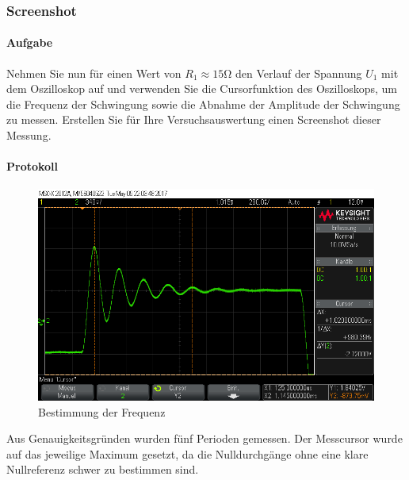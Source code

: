 \documentclass[10pt]{scrreprt}
\begin{document}
        \subsubsection{Screenshot}
        \paragraph{Aufgabe}
        Nehmen Sie nun für einen Wert von $R_1 \approx 15\si{\ohm}$ den Verlauf der Spannung $U_1$
        mit dem Oszilloskop auf und verwenden Sie die Cursorfunktion des Oszilloskops,
        um die Frequenz der Schwingung sowie die Abnahme der Amplitude
        der Schwingung zu messen. Erstellen Sie für Ihre Versuchsauswertung einen
        Screenshot dieser Messung.

        \paragraph{Protokoll}
        \begin{center}
            \begin{figure}[H]
                \includegraphics[width=\textwidth]{scope_19.png}
                \caption{Bestimmung der Frequenz}
            \end{figure}
        \end{center}

        Aus Genauigkeitsgründen wurden fünf Perioden gemessen. Der Messcursor
        wurde auf das jeweilige Maximum gesetzt, da die Nulldurchgänge ohne eine
        klare Nullreferenz schwer zu bestimmen sind.
\end{document}
